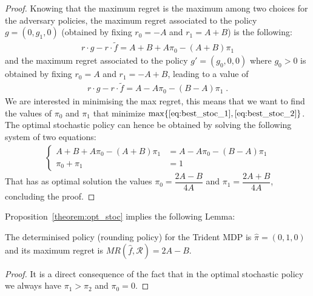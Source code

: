 \begin{proof}
Knowing that the maximum regret is the maximum among two choices for the adversary policies, the maximum regret associated to the policy $g =(0, g_1, 0)$ (obtained by fixing $r_0 = -A$ and $r_1 = A+B$) is the following:
\begin{align}
r \cdot g - r \cdot \tilde{f} = A + B +A \pi_0 -(A+B)\pi_1 \label{eq:best_stoc_1}
\end{align}   
and the maximum regret associated to the policy $g' = (g_0, 0, 0)$ where $g_0 > 0$ is obtained by fixing $r_0 = A$ and $r_1 = -A+B$, leading to a value of
\begin{align}
r \cdot g - r \cdot \tilde{f}  = A - A \pi_0 -(B-A)\pi_1 \label{eq:best_stoc_2}\;.
\end{align}   
We are interested in minimising the max regret, this means that we want to find the values of $\pi_0$ and $\pi_1$ that minimize $\max \{\eqref{eq:best_stoc_1}, \eqref{eq:best_stoc_2}\}$. The optimal stochastic policy can hence be obtained by solving the following system of two equations: 
\begin{align*}
\left\{
\begin{array}{ll}
A +B +A \pi_0 -(A+B)\pi_1 &= A - A \pi_0 -(B-A)\pi_1\\
\pi_0+\pi_1 &= 1
\end{array}
\right.
\end{align*} 
That has as optimal solution the values $\pi_{0}=\dfrac{2A - B}{4A}$ and $\pi_{1}=\dfrac{2A + B}{4A}$, concluding the proof.
\end{proof}


Proposition~\ref{theorem:opt_stoc} implies the following Lemma:
\begin{lemma}\label{lemma:heur_policy}
The determinised policy (rounding policy) for the Trident MDP is $\hat{\pi} = (0, 1, 0)$ %
and its maximum regret is $MR(\hat{f}, \mathcal{R}) = 2A-B$.
\end{lemma}
\begin{proof}
It is a direct consequence of the fact that in the optimal stochastic policy we always have $\pi_1 > \pi_2$ and $\pi_0 = 0$.
\end{proof}

